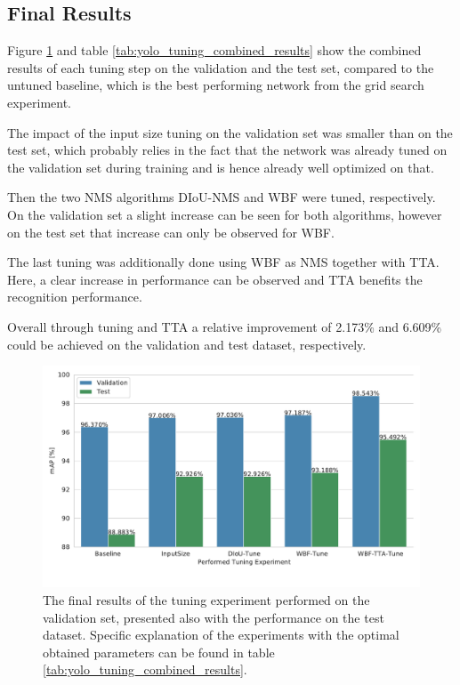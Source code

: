 \newpage

\subsection{Final Results}
\label{sec:yolo_final}

Figure \ref{fig:yolo_tuning_combined_results} and table \ref{tab:yolo_tuning_combined_results} show the combined results of each tuning step on the validation and the test set, compared to the untuned baseline, which is the best performing network from the grid search experiment.

The impact of the input size tuning on the validation set was smaller than on the test set, which probably relies in the fact that the network was already tuned on the validation set during training and is hence already well optimized on that.

Then the two \ac{NMS} algorithms \ac{DIoU}-\ac{NMS} and \ac{WBF} were tuned, respectively.
On the validation set a slight increase can be seen for both algorithms, however on the test set that increase can only be observed for \ac{WBF}.

The last tuning was additionally done using \ac{WBF} as \ac{NMS} together with \ac{TTA}.
Here, a clear increase in performance can be observed and \ac{TTA} benefits the recognition performance.

Overall through tuning and \ac{TTA} a relative improvement of 2.173\% and 6.609\% could be achieved on the validation and test dataset, respectively.

\begin{figure}
\begin{center}
    \includegraphics[width=13cm]{imgs/yolo_all_tuning.pdf}
    \caption{The final results of the tuning experiment performed on the validation set, presented also with the performance on the test dataset. Specific explanation of the experiments with the optimal obtained parameters can be found in table \ref{tab:yolo_tuning_combined_results}.}
    \label{fig:yolo_tuning_combined_results}
\end{center}
\end{figure}

